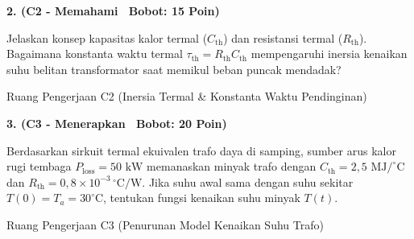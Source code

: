 \documentclass[10pt,a4paper]{article}
\begin{document}
\vspace{1mm}

\noindent\textbf{2. (C2 - Memahami \textbar\ Bobot: 15 Poin)}\par\vspace{0.5mm}
{\footnotesize Jelaskan konsep kapasitas kalor termal ($C_{\text{th}}$) dan resistansi termal ($R_{\text{th}}$). Bagaimana konstanta waktu termal $\tau_{\text{th}} = R_{\text{th}} C_{\text{th}}$ mempengaruhi inersia kenaikan suhu belitan transformator saat memikul beban puncak mendadak?}
\begin{answerbox}{Ruang Pengerjaan C2 (Inersia Termal \& Konstanta Waktu Pendinginan)}
  \vspace{2.1cm}
\end{answerbox}

\vspace{1mm}

\noindent\textbf{3. (C3 - Menerapkan \textbar\ Bobot: 20 Poin)}\par\vspace{0.5mm}
\noindent\begin{minipage}[t]{0.60\textwidth}%
  {\footnotesize Berdasarkan sirkuit termal ekuivalen trafo daya di samping, sumber arus kalor rugi tembaga $P_{\text{loss}} = 50\text{ kW}$ memanaskan minyak trafo dengan $C_{\text{th}} = 2{,}5\text{ MJ/}^\circ\text{C}$ dan $R_{\text{th}} = 0{,}8\times 10^{-3}\,^\circ\text{C/W}$. Jika suhu awal sama dengan suhu sekitar $T(0) = T_a = 30^\circ\text{C}$, tentukan fungsi kenaikan suhu minyak $T(t)$.}%
\end{minipage}%
\hfill%
\begin{minipage}[t]{0.37\textwidth}%
  \centering
\end{minipage}\par\vspace{1mm}
\begin{answerbox}{Ruang Pengerjaan C3 (Penurunan Model Kenaikan Suhu Trafo)}
  \vspace{2.8cm}
\end{answerbox}
\end{document}
